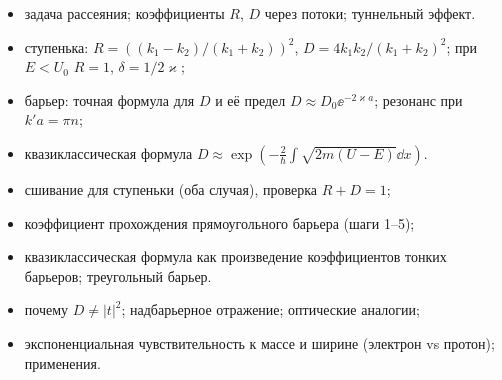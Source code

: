 \begin{examcheck}
\begin{itemize}
 \item задача рассеяния; коэффициенты $R$, $D$ через потоки; туннельный эффект.
\end{itemize}
\begin{itemize}
 \item ступенька: $R=((k_1-k_2)/(k_1+k_2))^2$, $D=4k_1k_2/(k_1+k_2)^2$; при $E<U_0$ $R=1$, $\delta=1/2\varkappa$;
 \item барьер: точная формула для $D$ и её предел $D\approx D_0\ee^{-2\varkappa a}$; резонанс при $k'a=\pi n$;
 \item квазиклассическая формула $D\approx\exp(-\frac2\hbar\int\sqrt{2m(U-E)}\dd x)$.
\end{itemize}
\begin{itemize}
 \item сшивание для ступеньки (оба случая), проверка $R+D=1$;
 \item коэффициент прохождения прямоугольного барьера (шаги 1--5);
 \item квазиклассическая формула как произведение коэффициентов тонких барьеров; треугольный барьер.
\end{itemize}
\begin{itemize}
 \item почему $D\neq|t|^2$; надбарьерное отражение; оптические аналогии;
 \item экспоненциальная чувствительность к массе и ширине (электрон vs протон); применения.
\end{itemize}
\end{examcheck}
